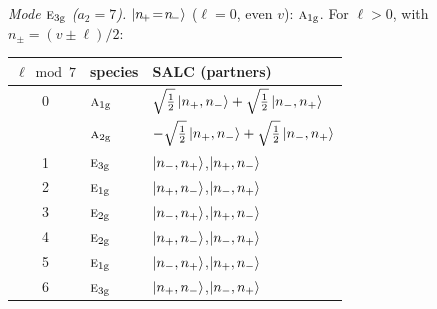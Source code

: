 \documentclass[11pt]{article}
\newcommand{\irr}[1]{\text{\normalfont\scshape #1}}
\newcommand{\ptag}[1]{\mathrm{#1}}
\begin{document}
\emph{Mode $\irr{e}_{3\ptag{g}}$ ($a_2=7$).} $\ket{n_{\!+}\!=\!n_{\!-}}$ ($\ell=0$, even $v$): $\irr{a}_{1\ptag{g}}$. For $\ell>0$, with $n_\pm=(v\pm\ell)/2$:
\begin{longtable}{c l l}\hline $\ell\bmod 7$ & species & SALC (partners)\\ \hline\endhead
0 & $\irr{a}_{1\ptag{g}}$ & $\sqrt{\tfrac{1}{2}}\ket{n_+,n_-}+\sqrt{\tfrac{1}{2}}\ket{n_-,n_+}$\\
 & $\irr{a}_{2\ptag{g}}$ & $-\sqrt{\tfrac{1}{2}}\ket{n_+,n_-}+\sqrt{\tfrac{1}{2}}\ket{n_-,n_+}$\\
1 & $\irr{e}_{3\ptag{g}}$ & $\ket{n_-,n_+}$,\quad $\ket{n_+,n_-}$\\
2 & $\irr{e}_{1\ptag{g}}$ & $\ket{n_+,n_-}$,\quad $\ket{n_-,n_+}$\\
3 & $\irr{e}_{2\ptag{g}}$ & $\ket{n_-,n_+}$,\quad $\ket{n_+,n_-}$\\
4 & $\irr{e}_{2\ptag{g}}$ & $\ket{n_+,n_-}$,\quad $\ket{n_-,n_+}$\\
5 & $\irr{e}_{1\ptag{g}}$ & $\ket{n_-,n_+}$,\quad $\ket{n_+,n_-}$\\
6 & $\irr{e}_{3\ptag{g}}$ & $\ket{n_+,n_-}$,\quad $\ket{n_-,n_+}$\\
\hline\end{longtable}
\end{document}

